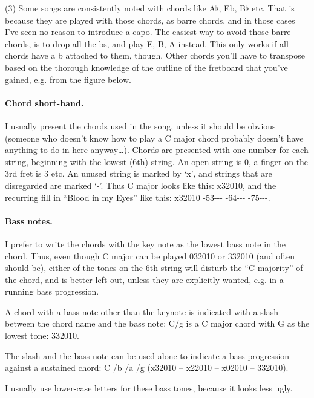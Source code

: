 \begin{articlelayout}
(3) Some songs are consistently noted with chords like A$\flat$, Eb,
B$\flat$ etc. That is because they are played with those chords, as
barre chords, and in those cases I've seen no reason to introduce a
capo. The easiest way to avoid those barre chords, is to drop all the
bs, and play E, B, A instead. This only works if all chords have a b
attached to them, though. Other chords you'll have to transpose based
on the thorough knowledge of the outline of the fretboard that you've
gained, e.g. from the figure below.

\paragraph*{Chord short-hand.} I usually present the chords used in
the song, unless it should be obvious (someone who doesn't know how to
play a C major chord probably doesn't have anything to do in here
anyway\ldots{}). Chords are presented with one number for each string,
beginning with the lowest (6th) string. An open string is 0, a finger
on the 3rd fret is 3 etc. An unused string is marked by `{}x'{}, and
strings that are disregarded are marked `{}-'{}. Thus C major looks
like this: x32010, and the recurring fill in ``{}Blood in my Eyes''{}
like this: x32010 -53{-}-{-} -64{-}-{-} -75{-}-{-}.

\paragraph*{Bass notes.} I prefer to write the chords with the key
note as the lowest bass note in the chord. Thus, even though C major
can be played 032010 or 332010 (and often should be), either of the
tones on the 6th string will disturb the ``{}C-majority''{} of the
chord, and is better left out, unless they are explicitly wanted,
e.g. in a running bass progression.

A chord with a bass note other than the keynote is indicated with a
slash between the chord name and the bass note: C/g is a C major chord
with G as the lowest tone: 332010.

The slash and the bass note can be used alone to indicate a bass
progression against a sustained chord: C /b /a /g (x32010 -- x22010 -- x02010 -- 332010).

I usually use lower-case letters for these bass tones, because it
looks less ugly.


\end{articlelayout}
